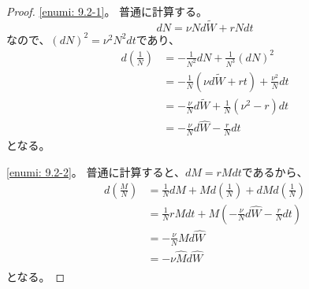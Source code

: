 \documentclass[uplatex]{jsarticle}
\theoremstyle{definition}
\begin{document}
\begin{proof}
  \ref{enumi: 9.2-1}。
  普通に計算する。
  \[
  dN = \nu Nd\tilde{W} + rNdt
  \]
  なので、\((dN)^2 = \nu^2N^2dt\)であり、
  \begin{align*}
    d\left( \frac{1}{N} \right)
    &= -\frac{1}{N^2}dN + \frac{1}{N^3}(dN)^2 \\
    &= -\frac{1}{N}\left(\nu d\tilde{W} + rt \right) + \frac{\nu^2}{N}dt \\
    &= -\frac{\nu}{N}d\tilde{W}
    + \frac{1}{N}(\nu^2 - r)dt \\
    &= -\frac{\nu}{N}d\hat{W} - \frac{r}{N}dt
  \end{align*}
  となる。

  \ref{enumi: 9.2-2}。
  普通に計算すると、\(dM = rMdt\)であるから、
  \begin{align*}
    d\left(\frac{M}{N}\right)
    &= \frac{1}{N}dM + Md\left( \frac{1}{N} \right)
    + dMd\left( \frac{1}{N} \right) \\
    &= \frac{1}{N}rMdt
    + M\left( -\frac{\nu}{N}d\hat{W} - \frac{r}{N}dt \right) \\
    &= -\frac{\nu}{N}Md\hat{W} \\
    &= -\nu\hat{M}d\hat{W} \\
  \end{align*}
  となる。


\end{proof}
\end{document}
